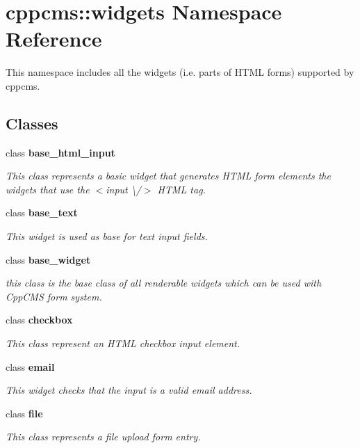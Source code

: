 \section{cppcms\+:\+:widgets Namespace Reference}
\label{namespacecppcms_1_1widgets}


This namespace includes all the widgets (i.\+e. parts of H\+T\+ML forms) supported by cppcms.  


\subsection*{Classes}
\begin{DoxyCompactItemize}
\item 
class {\bf base\+\_\+html\+\_\+input}
\begin{DoxyCompactList}\small\item\em This class represents a basic widget that generates H\+T\+ML form elements the widgets that use the $<$input \textbackslash{}/$>$ H\+T\+ML tag. \end{DoxyCompactList}\item 
class {\bf base\+\_\+text}
\begin{DoxyCompactList}\small\item\em This widget is used as base for text input fields. \end{DoxyCompactList}\item 
class {\bf base\+\_\+widget}
\begin{DoxyCompactList}\small\item\em this class is the base class of all renderable widgets which can be used with Cpp\+C\+MS form system. \end{DoxyCompactList}\item 
class {\bf checkbox}
\begin{DoxyCompactList}\small\item\em This class represent an H\+T\+ML checkbox input element. \end{DoxyCompactList}\item 
class {\bf email}
\begin{DoxyCompactList}\small\item\em This widget checks that the input is a valid email address. \end{DoxyCompactList}\item 
class {\bf file}
\begin{DoxyCompactList}\small\item\em This class represents a file upload form entry. \end{DoxyCompactList}\item 

\end{DoxyCompactItemize}
